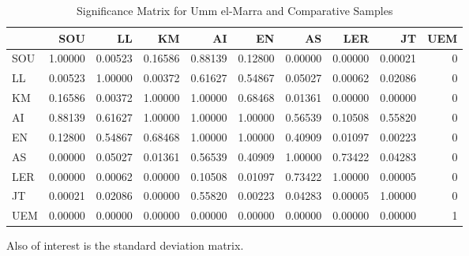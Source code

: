 \documentclass[]{book}
\begin{document}
\begin{table}

\caption{\label{tab:unnamed-chunk-5}Significance Matrix for Umm el-Marra and Comparative Samples}
\centering
\begin{tabular}[t]{l|r|r|r|r|r|r|r|r|r}
\hline
  & SOU & LL & KM & AI & EN & AS & LER & JT & UEM\\
\hline
SOU & 1.00000 & 0.00523 & 0.16586 & 0.88139 & 0.12800 & 0.00000 & 0.00000 & 0.00021 & 0\\
\hline
LL & 0.00523 & 1.00000 & 0.00372 & 0.61627 & 0.54867 & 0.05027 & 0.00062 & 0.02086 & 0\\
\hline
KM & 0.16586 & 0.00372 & 1.00000 & 1.00000 & 0.68468 & 0.01361 & 0.00000 & 0.00000 & 0\\
\hline
AI & 0.88139 & 0.61627 & 1.00000 & 1.00000 & 1.00000 & 0.56539 & 0.10508 & 0.55820 & 0\\
\hline
EN & 0.12800 & 0.54867 & 0.68468 & 1.00000 & 1.00000 & 0.40909 & 0.01097 & 0.00223 & 0\\
\hline
AS & 0.00000 & 0.05027 & 0.01361 & 0.56539 & 0.40909 & 1.00000 & 0.73422 & 0.04283 & 0\\
\hline
LER & 0.00000 & 0.00062 & 0.00000 & 0.10508 & 0.01097 & 0.73422 & 1.00000 & 0.00005 & 0\\
\hline
JT & 0.00021 & 0.02086 & 0.00000 & 0.55820 & 0.00223 & 0.04283 & 0.00005 & 1.00000 & 0\\
\hline
UEM & 0.00000 & 0.00000 & 0.00000 & 0.00000 & 0.00000 & 0.00000 & 0.00000 & 0.00000 & 1\\
\hline
\end{tabular}
\end{table}

Also of interest is the standard deviation matrix.
\end{document}
